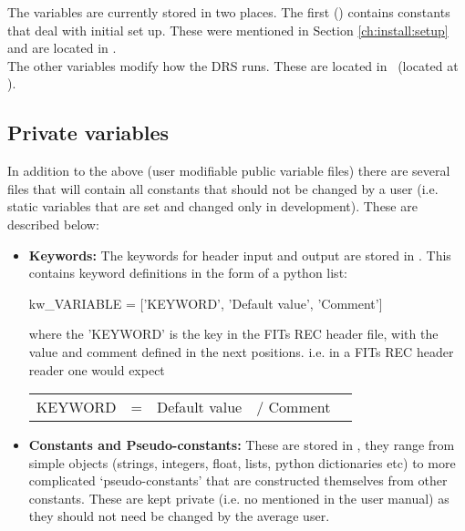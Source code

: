 The variables are currently stored in two places. The first (\configtxtfile) contains constants that deal with initial set up. These were mentioned in Section \ref{ch:install:setup} and are located in \configtxtfilepath. \\

\noindent The other variables modify how the DRS runs. These are located in \constantsfile\, (located at \constantsfilepath).  \\


\ifdevguide
\subsection{Private variables}

\noindent In addition to the above (user modifiable public variable files) there are several files that will contain all constants that should not be changed by a user (i.e. static variables that are set and changed only in development). These are described below:

\begin{itemize}

	\item \textbf{Keywords:} The keywords for header input and output are stored in \spirouKeywords. This contains keyword definitions in the form of a python list:  \\

	\begin{pythonbox}
	kw_VARIABLE = ['KEYWORD', 'Default value', 'Comment']
	\end{pythonbox}

	\noindent where the 'KEYWORD' is the key in the FITs REC header file, with the value and comment defined in the next positions. i.e. in a FITs REC header reader one would expect

	\begin{thighlight}
	\begin{tabular}{l c r c l}
	KEYWORD & = & Default value & / Comment \\
	\end{tabular}
	\end{thighlight}


	\item \textbf{Constants and Pseudo-constants:} These are stored in \spirouCONST, they range from simple objects (strings, integers, float, lists, python dictionaries etc) to more complicated `pseudo-constants' that are constructed themselves from other constants. These are kept private (i.e. no mentioned in the user manual) as they should not need be changed by the average user.

\end{itemize}

